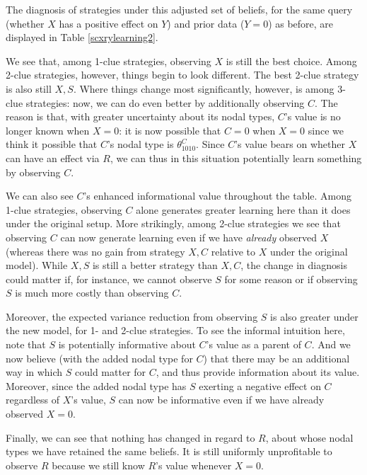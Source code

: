 \documentclass[
  12pt,
]{book}
\begin{document}
The diagnosis of strategies under this adjusted set of beliefs, for the same query (whether \(X\) has a positive effect on \(Y\)) and prior data (\(Y=0\)) as before, are displayed in Table \ref{scxrylearning2}.

We see that, among 1-clue strategies, observing \(X\) is still the best choice. Among 2-clue strategies, however, things begin to look different. The best 2-clue strategy is also still \(X, S\). Where things change most significantly, however, is among 3-clue strategies: now, we can do even better by additionally observing \(C\). The reason is that, with greater uncertainty about its nodal types, \(C\)'s value is no longer known when \(X=0\): it is now possible that \(C=0\) when \(X=0\) since we think it possible that \(C\)'s nodal type is \(\theta^C_{1010}\). Since \(C\)'s value bears on whether \(X\) can have an effect via \(R\), we can thus in this situation potentially learn something by observing \(C\).

We can also see \(C\)'s enhanced informational value throughout the table. Among 1-clue strategies, observing \(C\) alone generates greater learning here than it does under the original setup. More strikingly, among 2-clue strategies we see that observing \(C\) can now generate learning even if we have \emph{already} observed \(X\) (whereas there was no gain from strategy \(X, C\) relative to \(X\) under the original model). While \(X, S\) is still a better strategy than \(X, C\), the change in diagnosis could matter if, for instance, we cannot observe \(S\) for some reason or if observing \(S\) is much more costly than observing \(C\).

Moreover, the expected variance reduction from observing \(S\) is also greater under the new model, for 1- and 2-clue strategies. To see the informal intuition here, note that \(S\) is potentially informative about \(C\)'s value as a parent of \(C\). And we now believe (with the added nodal type for \(C\)) that there may be an additional way in which \(S\) could matter for \(C\), and thus provide information about its value. Moreover, since the added nodal type has \(S\) exerting a negative effect on \(C\) regardless of \(X\)'s value, \(S\) can now be informative even if we have already observed \(X=0\).

Finally, we can see that nothing has changed in regard to \(R\), about whose nodal types we have retained the same beliefs. It is still uniformly unprofitable to observe \(R\) because we still know \(R\)'s value whenever \(X=0\).
\end{document}
